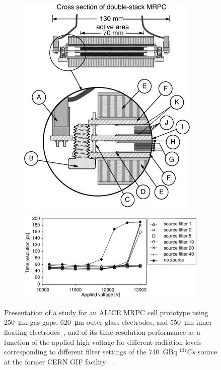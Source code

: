 	\begin{figure}[H]
		\begin{subfigure}{0.4\linewidth}
			\centering
			\includegraphics[width = 0.45\plotwidth]{fig/chapt3/MRPC-Layout.png}
			\caption{\label{fig:ALICEMRPC:A}}
		\end{subfigure}
		\begin{subfigure}{0.6\linewidth}
			\centering
			\includegraphics[width = 0.7\plotwidth]{fig/chapt3/ALICE-2002-time-res.png}
			\caption{\label{fig:ALICEMRPC:B}}
		\end{subfigure}
		\caption{\label{fig:ALICEMRPC} Presentation of a study for an ALICE MRPC cell prototype using \SI{250}{\micro m} gas gaps, \SI{620}{\micro m} outer glass electrodes, and \SI{550}{\micro m} inner floating electrodes~, and of its time resolution performance as a function of the applied high voltage for different radiation levels corresponding to different filter settings of the \SI{740}{GBq} $^{137}Cs$ source at the former CERN GIF facility~~\cite{ALICE2002}.}
	\end{figure}
	
